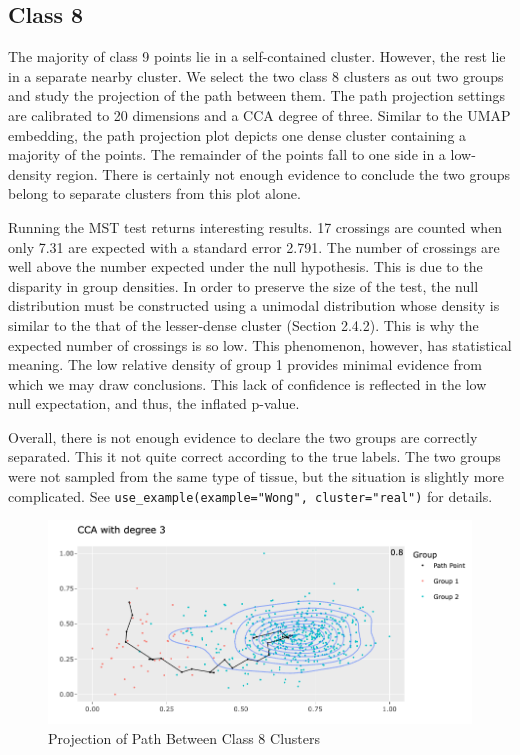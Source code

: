 \documentclass{article}
\begin{document}
\subsection{Class 8}
The majority of class 9 points lie in a self-contained cluster. However, the rest lie in a separate nearby cluster. We select the two class 8 clusters as out two groups and study the projection of the path between them. The path projection settings are calibrated to 20 dimensions and a CCA degree of three. Similar to the UMAP embedding, the path projection plot depicts one dense cluster containing a majority of the points. The remainder of the points fall to one side in a low-density region. There is certainly not enough evidence to conclude the two groups belong to separate clusters from this plot alone.

Running the MST test returns interesting results. 17 crossings are counted when only 7.31 are expected with a standard error 2.791. The number of crossings are well above the number expected under the null hypothesis. This is due to the disparity in group densities. In order to preserve the size of the test, the null distribution must be constructed using a unimodal distribution whose density is similar to the that of the lesser-dense cluster (Section 2.4.2). This is why the expected number of crossings is so low. This phenomenon, however, has statistical meaning. The low relative density of group 1 provides minimal evidence from which we may draw conclusions. This lack of confidence is reflected in the low null expectation, and thus, the inflated p-value.

Overall, there is not enough evidence to declare the two groups are correctly separated. This it not quite correct according to the true labels. The two groups were not sampled from the same type of tissue, but the situation is slightly more complicated. See \texttt{use\_example(example="Wong", cluster="real")} for details.

\renewcommand{\figurename}{Figure}
\renewcommand{\thefigure}{8}
\begin{figure}[!t]
\centering
\includegraphics[scale=0.45]{class 8 projection Wong}
\caption{Projection of Path Between Class 8 Clusters}
\end{figure}
\end{document}
